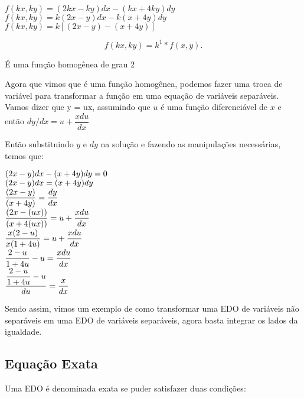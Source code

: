 \begin{center}
$ f(kx,ky) = (2kx - ky)dx  - (kx + 4ky)dy$ \\
$ f(kx,ky) = k(2x - y)dx - k(x + 4y)dy  $ \\
$ f(kx,ky) = k[(2x - y) - (x + 4y)] $ 
\end{center}
\begin{equation}
f(kx,ky) = k^1 * f(x,y).
\end{equation}

É uma função homogênea de grau 2

Agora que vimos que é uma função homogênea, podemos fazer uma troca de variável para transformar a função em uma equação de variáveis separáveis. Vamos dizer que y = ux, assumindo que $u$ é uma função diferenciável de $x$ e então $ dy/dx = u + \dfrac{xdu}{dx} $

Então substituindo $y$ e $dy$ na solução e fazendo as manipulações necessárias, temos que: 

\begin{center}
$
	(2x - y )dx - (x + 4y)dy = 0 \linebreak
$
\\
$
	(2x-y)dx = (x+4y)dy  \linebreak
$
\\
$
	\dfrac{(2x-y)}{(x+4y)} = \dfrac{dy}{dx}  \linebreak
$
\\
$
	\dfrac{(2x-(ux))}{(x+4(ux))} = u + \dfrac{xdu}{dx}   \linebreak
$
\\
$
	\dfrac{x(2-u)}{x(1+4u)} = u + \dfrac{xdu}{dx}   \linebreak
$
\\
$
	\dfrac{2-u}{1+4u} - u =  \dfrac{xdu}{dx}   \linebreak
$
\\
$
	\dfrac{\dfrac{2-u}{1+4u} - u}{du} =  \dfrac{x}{dx}   \linebreak
$
\end{center}

Sendo assim, vimos um exemplo de como transformar uma EDO de variáveis não separáveis em uma EDO de variáveis separáveis, agora basta integrar os lados da igualdade.


\subsection[Equação Exata]{Equação Exata}

Uma EDO é denominada exata se puder satisfazer duas condições: 

